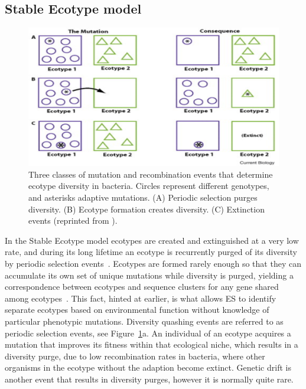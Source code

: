 \subsection*{Stable Ecotype model}

\begin{figure}[h!]
 \centering
 \label{fig:StableEvents}
 \includegraphics{images/StableEcotypeEvents-CH2}
 \caption[Events predicted by the Stable Ecotype model.]{Three classes of mutation and recombination events that determine ecotype diversity in bacteria. Circles represent different genotypes, and asterisks adaptive mutations. (A) Periodic selection purges diversity. (B) Ecotype formation creates diversity. (C) Extinction events (reprinted from \protect\cite{cohan2007systematics}).}
 \label{fig:StableEvents}
\end{figure}

In the Stable Ecotype model ecotypes are created and extinguished at a very low rate, and during its long lifetime an ecotype is recurrently purged of its diversity by periodic selection events~\cite{cohan2007systematics}.
Ecotypes are formed rarely enough so that they can accumulate its own set of unique mutations while diversity is purged, yielding a correspondence between ecotypes and sequence clusters for any gene shared among ecotypes~\cite{cohan2008origins}.
This fact, hinted at earlier, is what allows ES to identify separate ecotypes based on environmental function without knowledge of particular phenotypic mutations.
Diversity quashing events are referred to as periodic selection events, see Figure~\ref{fig:StableEvents}a.
An individual of an ecotype acquires a mutation that improves its fitness within that ecological niche, which results in a diversity purge, due to low recombination rates in bacteria, where other organisms in the ecotype without the adaption become extinct.
Genetic drift is another event that results in diversity purges, however it is normally quite rare.


